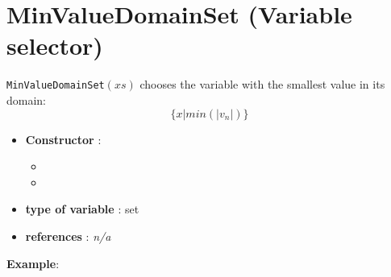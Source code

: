 \section{MinValueDomainSet (Variable selector)}\label{minvaldomainset:minvaldomainsetvarselector}\hypertarget{minvaldomainset:minvaldomainsetvarselector}{}
\begin{notedef}
  \texttt{MinValueDomainSet}$(xs)$ chooses the variable with the smallest value in its domain:
$$\{x | min(|v_{n}|)\}$$
\end{notedef}

\begin{itemize}
	\item \textbf{Constructor} : 
	\begin{itemize}
	\item {}
	\item {}
	\end{itemize}	
	\item \textbf{type of variable} : set
	\item \textbf{references} : \emph{n/a}
\end{itemize}

\textbf{Example}:
%

